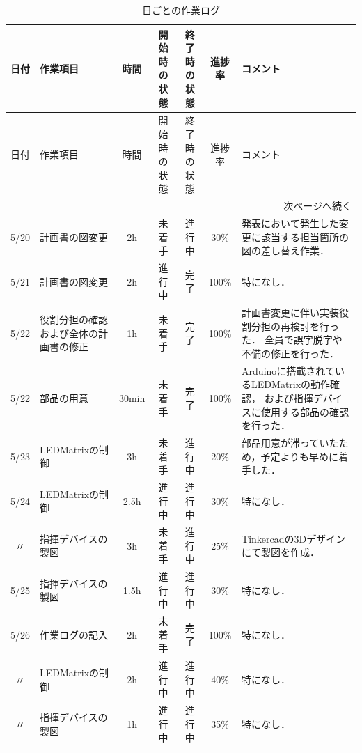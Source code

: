 \documentclass[uplatex,dvipdfmx,a4paper,11pt]{jsarticle}
\begin{document}
    \begin{longtable}{|c|p{3cm}|c|c|c|c|p{5cm}|}
    \caption{日ごとの作業ログ} \\
    \hline
    日付 & 作業項目 & 時間 & 開始時の状態 & 終了時の状態 & 進捗率 & コメント \\
    \hline
    \endfirsthead
    
    \hline
    日付 & 作業項目 & 時間 & 開始時の状態 & 終了時の状態 & 進捗率 & コメント \\
    \hline
    \endhead
    
    \hline
    \multicolumn{7}{r}{次ページへ続く} \\
    \hline
    \endfoot
    
    \hline
    \endlastfoot
    
    5/20 & 計画書の図変更 & 2h &
    未着手 &
    進行中 &
    30\% &
    発表において発生した変更に該当する担当箇所の図の差し替え作業． \\
    \hline
    
    5/21 & 計画書の図変更 & 2h &
    進行中 &
    完了 &
    100\% &
    特になし． \\
    \hline
    
    5/22 & 役割分担の確認および全体の計画書の修正 & 1h &
    未着手 &
    完了 &
    100\% &
    計画書変更に伴い実装役割分担の再検討を行った．
    全員で誤字脱字や不備の修正を行った． \\
    \hline
    
    5/22 & 部品の用意 & 30min &
    未着手 &
    完了 &
    100\% &
    Arduinoに搭載されているLEDMatrixの動作確認，
    および指揮デバイスに使用する部品の確認を行った． \\
    \hline
    
    5/23 & LEDMatrixの制御 & 3h &
    未着手 &
    進行中 &
    20\% &
    部品用意が滞っていたため，予定よりも早めに着手した． \\
    \hline
    
    5/24 & LEDMatrixの制御 & 2.5h &
    進行中 &
    進行中 &
    30\% &
    特になし． \\
    \hline
    
    〃 & 指揮デバイスの製図 & 3h &
    未着手 &
    進行中 &
    25\% &
    Tinkercadの3Dデザインにて製図を作成． \\

    \hline

    5/25 & 指揮デバイスの製図 & 1.5h &
    進行中 &
    進行中 &
    30\% &
    特になし． \\
    \hline

    5/26 & 作業ログの記入 & 2h &
    未着手 &
    完了 &
    100\% &
    特になし． \\  

    \hline

    〃 & LEDMatrixの制御 & 2h &
    進行中 &
    進行中 &
    40\% &
    特になし． \\ 

    \hline
    
    〃 & 指揮デバイスの製図 & 1h &
    進行中 &
    進行中 &
    35\% &
    特になし． \\ 
    
    \end{longtable}
\end{document}
